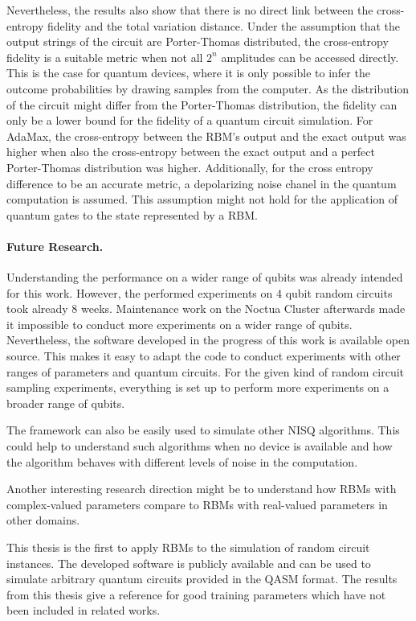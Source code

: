 Nevertheless, the results also show that there is no direct link between the cross-entropy
fidelity and the total variation distance. Under the assumption that the output strings of 
the circuit are Porter-Thomas distributed, the cross-entropy fidelity is a suitable metric
when not all $2^n$ amplitudes can be accessed directly. This is the case for quantum devices, 
where it is only possible to infer the outcome probabilities by drawing samples from the computer.
As the distribution of the circuit might differ from the Porter-Thomas distribution, 
the fidelity can only be a lower bound for the fidelity of a quantum circuit simulation.
For AdaMax, the cross-entropy between the RBM's output and the exact output was 
higher when also the cross-entropy between the exact output and a perfect Porter-Thomas 
distribution was higher. Additionally, for the cross entropy difference to be an accurate 
metric, a depolarizing noise chanel in the quantum computation is assumed. This assumption 
might not hold for the application of quantum gates to the state represented by a RBM.

\paragraph{Future Research.}
Understanding the performance on a wider range of qubits was already intended for this work. 
However, the performed experiments 
on 4 qubit random circuits took already 8 weeks. Maintenance work on the Noctua Cluster 
afterwards made it impossible to conduct more experiments on a wider range of qubits.
Nevertheless, the software developed in the progress of this work is available open source. 
This makes it easy to adapt the code to conduct experiments 
with other ranges of parameters and quantum circuits. For the given kind of random circuit 
sampling experiments, everything is set up to perform more experiments on a broader range of 
qubits.

The framework can also be easily used to simulate other NISQ algorithms. This could help to 
understand such algorithms when no device is available and how the algorithm
behaves with different levels of noise in the computation.

Another interesting research direction might be 
to understand how RBMs with complex-valued parameters compare to RBMs with real-valued parameters 
in other domains.

This thesis is the first to apply RBMs to the simulation of random circuit instances. 
The developed software is publicly available and can be used to simulate arbitrary quantum 
circuits provided in the QASM format. The results from 
this thesis give a reference for good training parameters which have not been included in related works.


